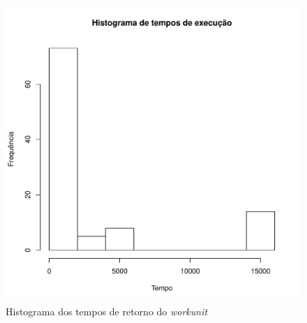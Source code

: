 \begin{figure}
  \centering
  \includegraphics[scale=0.6]{histograma.pdf}
  \caption{Histograma dos tempos de retorno do \emph{workunit}}
  \label{histograma}
\end{figure}



